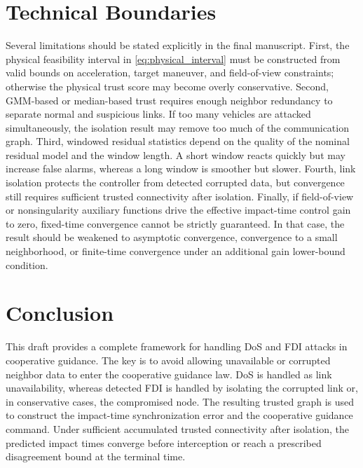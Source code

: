 \documentclass[lettersize,journal]{IEEEtran}
\begin{document}
\section{Technical Boundaries}

Several limitations should be stated explicitly in the final manuscript. First, the physical feasibility interval in \eqref{eq:physical_interval} must be constructed from valid bounds on acceleration, target maneuver, and field-of-view constraints; otherwise the physical trust score may become overly conservative. Second, GMM-based or median-based trust requires enough neighbor redundancy to separate normal and suspicious links. If too many vehicles are attacked simultaneously, the isolation result may remove too much of the communication graph. Third, windowed residual statistics depend on the quality of the nominal residual model and the window length. A short window reacts quickly but may increase false alarms, whereas a long window is smoother but slower. Fourth, link isolation protects the controller from detected corrupted data, but convergence still requires sufficient trusted connectivity after isolation. Finally, if field-of-view or nonsingularity auxiliary functions drive the effective impact-time control gain to zero, fixed-time convergence cannot be strictly guaranteed. In that case, the result should be weakened to asymptotic convergence, convergence to a small neighborhood, or finite-time convergence under an additional gain lower-bound condition.

\section{Conclusion}

This draft provides a complete framework for handling DoS and FDI attacks in cooperative guidance. The key is to avoid allowing unavailable or corrupted neighbor data to enter the cooperative guidance law. DoS is handled as link unavailability, whereas detected FDI is handled by isolating the corrupted link or, in conservative cases, the compromised node. The resulting trusted graph is used to construct the impact-time synchronization error and the cooperative guidance command. Under sufficient accumulated trusted connectivity after isolation, the predicted impact times converge before interception or reach a prescribed disagreement bound at the terminal time.

\balance
\end{document}
